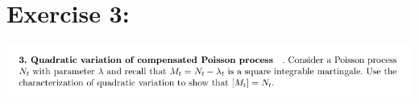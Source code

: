 \documentclass[document.tex]{subfiles}
\begin{document}
\section*{Exercise 3:}


\includegraphics[width=\textwidth]{ex3.png}
\end{document}

